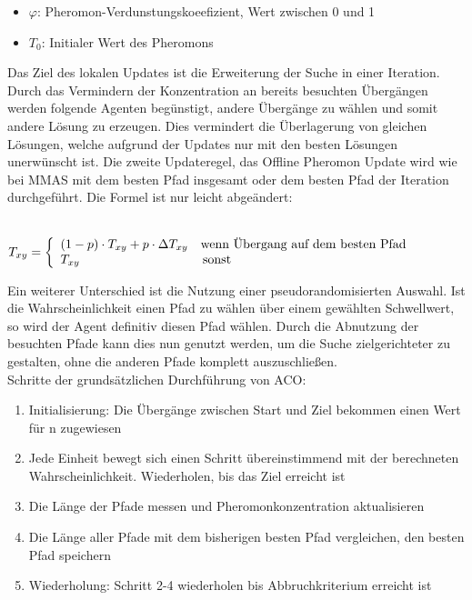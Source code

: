 \begin{itemize}
  \item $\varphi$: Pheromon-Verdunstungskoeefizient, Wert zwischen 0 und 1
  \item $T_0$: Initialer Wert des Pheromons
\end{itemize}
Das Ziel des lokalen Updates ist die Erweiterung der Suche in einer Iteration. Durch das Vermindern der Konzentration an bereits besuchten Übergängen werden folgende Agenten begünstigt, andere Übergänge zu wählen und somit andere Lösung zu erzeugen. Dies vermindert die Überlagerung von gleichen Lösungen, welche aufgrund der Updates nur mit den besten Lösungen unerwünscht ist\cite{dorigo1997ant}. Die zweite Updateregel, das Offline Pheromon Update wird wie bei MMAS mit dem besten Pfad insgesamt oder dem besten Pfad der Iteration durchgeführt. Die Formel ist nur leicht abgeändert: \\\\

\begin{large}
  $T_{xy}  = \left\{
  \begin{array}{ll}
  (1-p)\cdot T_{xy}+p\cdot \Delta T_{xy} & \normalsize \textrm{wenn Übergang auf dem besten Pfad} \\
  T_{xy} & \, \normalsize \textrm{sonst} \\
  \end{array}
\right. $  
\end{large}


Ein weiterer Unterschied ist die Nutzung einer pseudorandomisierten Auswahl. Ist die Wahrscheinlichkeit einen Pfad zu wählen über einem gewählten Schwellwert, so wird der Agent definitiv diesen Pfad wählen. Durch die Abnutzung der besuchten Pfade kann dies nun genutzt werden, um die Suche zielgerichteter zu gestalten, ohne die anderen Pfade komplett auszuschließen\cite{gambardella1996solving}.\\

Schritte der grundsätzlichen Durchführung von ACO:
\begin{enumerate}
  \item Initialisierung: Die Übergänge zwischen Start und Ziel bekommen einen Wert für n zugewiesen
  \item Jede Einheit bewegt sich einen Schritt übereinstimmend mit der berechneten Wahrscheinlichkeit.  Wiederholen, bis das Ziel erreicht ist
  \item Die Länge der Pfade messen und Pheromonkonzentration aktualisieren
  \item Die Länge aller Pfade mit dem bisherigen besten Pfad vergleichen, den besten Pfad speichern
  \item Wiederholung: Schritt 2-4 wiederholen bis Abbruchkriterium erreicht ist
\end{enumerate}

